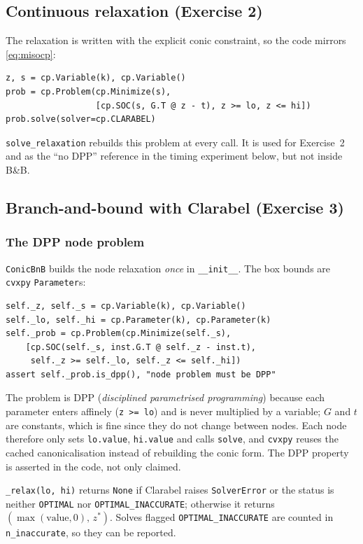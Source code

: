 \documentclass[11pt,a4paper]{article}
\newcommand{\BB}{B\&B}
\begin{document}
\subsection{Continuous relaxation (Exercise 2)}

The relaxation is written with the explicit conic constraint, so the code mirrors \eqref{eq:misocp}:
\begin{lstlisting}
z, s = cp.Variable(k), cp.Variable()
prob = cp.Problem(cp.Minimize(s),
                  [cp.SOC(s, G.T @ z - t), z >= lo, z <= hi])
prob.solve(solver=cp.CLARABEL)
\end{lstlisting}
\texttt{solve\_relaxation} rebuilds this problem at every call. It is used for Exercise~2 and as the ``no DPP'' reference in the timing experiment below, but not inside \BB{}.

\subsection{Branch-and-bound with Clarabel (Exercise 3)}

\subsubsection{The DPP node problem}

\texttt{ConicBnB} builds the node relaxation \emph{once} in \texttt{\_\_init\_\_}. The box bounds are \texttt{cvxpy} \texttt{Parameter}s:
\begin{lstlisting}
self._z, self._s = cp.Variable(k), cp.Variable()
self._lo, self._hi = cp.Parameter(k), cp.Parameter(k)
self._prob = cp.Problem(cp.Minimize(self._s),
    [cp.SOC(self._s, inst.G.T @ self._z - inst.t),
     self._z >= self._lo, self._z <= self._hi])
assert self._prob.is_dpp(), "node problem must be DPP"
\end{lstlisting}
The problem is DPP (\emph{disciplined parametrised programming}) because each parameter enters affinely (\texttt{z >= lo}) and is never multiplied by a variable; $G$ and $t$ are constants, which is fine since they do not change between nodes. Each node therefore only sets \texttt{lo.value}, \texttt{hi.value} and calls \texttt{solve}, and \texttt{cvxpy} reuses the cached canonicalisation instead of rebuilding the conic form. The DPP property is asserted in the code, not only claimed.

\texttt{\_relax(lo, hi)} returns \texttt{None} if Clarabel raises \texttt{SolverError} or the status is neither \texttt{OPTIMAL} nor \texttt{OPTIMAL\_INACCURATE}; otherwise it returns $(\max(\text{value},0),\,z^\ast)$. Solves flagged \texttt{OPTIMAL\_INACCURATE} are counted in \texttt{n\_inaccurate}, so they can be reported.
\end{document}
